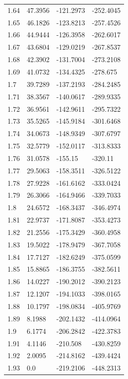 \begin{tabular}{llll}
1.64 & 47.3956 & -121.2973 & -252.4045 \\
1.65 & 46.1826 & -123.8213 & -257.4526 \\
1.66 & 44.9444 & -126.3958 & -262.6017 \\
1.67 & 43.6804 & -129.0219 & -267.8537 \\
1.68 & 42.3902 & -131.7004 & -273.2108 \\
1.69 & 41.0732 & -134.4325 & -278.675 \\
1.7 & 39.7289 & -137.2193 & -284.2485 \\
1.71 & 38.3567 & -140.0617 & -289.9335 \\
1.72 & 36.9561 & -142.9611 & -295.7322 \\
1.73 & 35.5265 & -145.9184 & -301.6468 \\
1.74 & 34.0673 & -148.9349 & -307.6797 \\
1.75 & 32.5779 & -152.0117 & -313.8333 \\
1.76 & 31.0578 & -155.15 & -320.11 \\
1.77 & 29.5063 & -158.3511 & -326.5122 \\
1.78 & 27.9228 & -161.6162 & -333.0424 \\
1.79 & 26.3066 & -164.9466 & -339.7033 \\
1.8 & 24.6572 & -168.3437 & -346.4974 \\
1.81 & 22.9737 & -171.8087 & -353.4273 \\
1.82 & 21.2556 & -175.3429 & -360.4958 \\
1.83 & 19.5022 & -178.9479 & -367.7058 \\
1.84 & 17.7127 & -182.6249 & -375.0599 \\
1.85 & 15.8865 & -186.3755 & -382.5611 \\
1.86 & 14.0227 & -190.2012 & -390.2123 \\
1.87 & 12.1207 & -194.1033 & -398.0165 \\
1.88 & 10.1797 & -198.0834 & -405.9769 \\
1.89 & 8.1988 & -202.1432 & -414.0964 \\
1.9 & 6.1774 & -206.2842 & -422.3783 \\
1.91 & 4.1146 & -210.508 & -430.8259 \\
1.92 & 2.0095 & -214.8162 & -439.4424 \\
1.93 & 0.0 & -219.2106 & -448.2313 \\
\bottomrule
\end{tabular}
